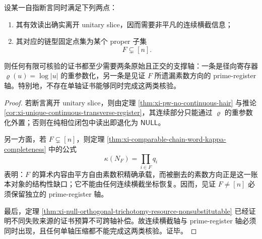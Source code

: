 \begin{proposition}[离切片真缺陷证书的二轴下界]\label{prop:xi-offslice-nontrivial-certificate-two-axis-lower-bound}
设某一自指断言同时满足下列两点：
\begin{enumerate}
  \item 其有效读出确实离开 unitary slice，因而需要非平凡的连续横截信息；
  \item 其对应的链型固定点集为某个 proper 子集
  \[
  F\subsetneq[n].
  \]
\end{enumerate}
则任何有限可核验的证书都至少需要两条原始且正交的支撑轴：一条是径向寄存器 \(\varrho(u)=\log|u|\) 的重参数化，另一条是见证 \(F\) 所遗漏素数方向的 prime-register 轴。特别地，不存在单轴证书能够同时完成这两类核验。
\end{proposition}
\begin{proof}
若断言离开 unitary slice，则由定理 \ref{thm:xi-pw-no-continuous-hair} 与推论 \ref{cor:xi-unique-continuous-transverse-register}，其连续部分只能通过 \(\varrho\) 的重参数化外置；否则在纯相位闭包中读出即退化为 \(\mathsf{NULL}\)。

另一方面，若 \(F\subsetneq[n]\)，则定理 \ref{thm:xi-comparable-chain-word-kappa-completeness} 中的公式
\[
\kappa(N_F)=\prod_{i\in F}q_i
\]
表明：\(F\) 的算术内容由平方自由素数积精确承载，而被删去的素数方向正是这一账本对象的结构性缺口；它不能由任何连续横截坐标恢复。因而，见证 \(F\neq[n]\) 必须保留独立的 prime-register 轴。

最后，定理 \ref{thm:xi-null-orthogonal-trichotomy-resource-nonsubstitutable} 已经证明不同失败来源的证书预算不可跨轴补偿。故连续横截轴与 prime-register 轴必须同时出现，且任何单轴压缩都不能完成这两类核验。证毕。
\end{proof}

\endinput
